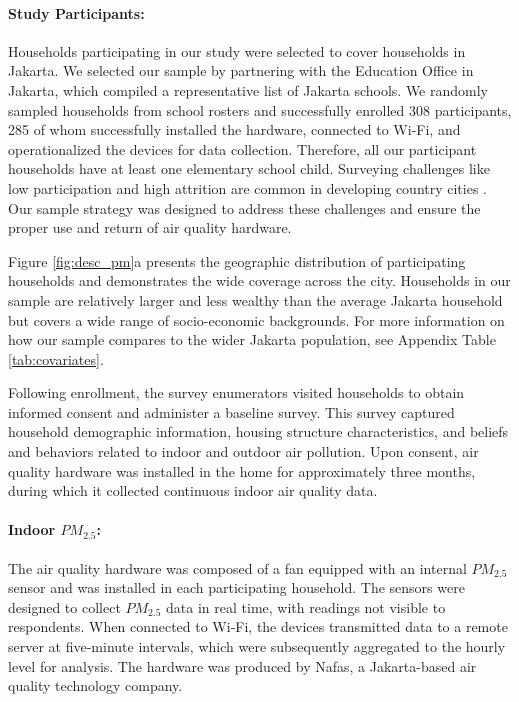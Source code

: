 \documentclass[reqno,12pt,notitlepage]{article}
\begin{document}
\paragraph{Study Participants:} Households participating in our study were selected to cover households in Jakarta. We selected our sample by partnering with the Education Office in Jakarta, which compiled a representative list of Jakarta schools. We randomly sampled households from school rosters and successfully enrolled 308 participants, 285 of whom successfully installed the hardware, connected to Wi-Fi, and operationalized the devices for data collection. Therefore, all our participant households have at least one elementary school child. Surveying challenges like low participation and high attrition are common in developing country cities \citep{greenstone_indoor_2021}. Our sample strategy was designed to address these challenges and ensure the proper use and return of air quality hardware.

Figure \ref{fig:desc_pm}a presents the geographic distribution of participating households and demonstrates the wide coverage across the city. Households in our sample are relatively larger and less wealthy than the average Jakarta household but covers a wide range of socio-economic backgrounds. For more information on how our sample compares to the wider Jakarta population, see Appendix Table \ref{tab:covariates}.

Following enrollment, the survey enumerators visited households to obtain informed consent and administer a baseline survey. This survey captured household demographic information, housing structure characteristics, and beliefs and behaviors related to indoor and outdoor air pollution. Upon consent, air quality hardware was installed in the home for approximately three months, during which it collected continuous indoor air quality data.

\paragraph{Indoor $PM_{2.5}$:} The air quality hardware was composed of a fan equipped with an internal $PM_{2.5}$ sensor and was installed in each participating household. The sensors were designed to collect $PM_{2.5}$ data in real time, with readings not visible to respondents. When connected to Wi-Fi, the devices transmitted data to a remote server at five-minute intervals, which were subsequently aggregated to the hourly level for analysis. The hardware was produced by Nafas, a Jakarta-based air quality technology company. 
\end{document}

